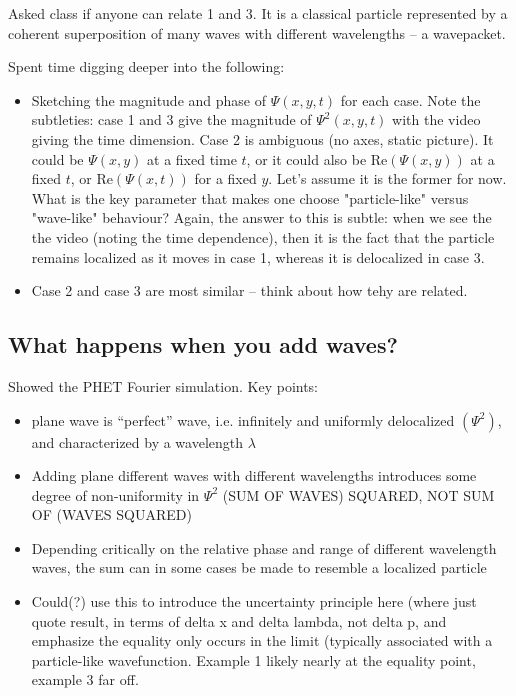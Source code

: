 \documentclass{article}
\begin{document}
Asked class if anyone can relate 1 and 3. It is a classical particle represented by a coherent superposition of many waves with different wavelengths -- a wavepacket. 

Spent time digging deeper into the following:

\begin{itemize}
    \item Sketching the magnitude and phase of $\Psi(x,y,t)$ for each case. Note the subtleties: case 1 and 3 give the magnitude of $\Psi^2(x,y,t)$ with the video giving the time dimension. Case 2 is ambiguous (no axes, static picture). It could be $\Psi(x,y)$ at a fixed time $t$, or it could also be $\text{Re} \left( \Psi(x,y) \right)$ at a fixed $t$, or $\text{Re} \left( \Psi(x,t) \right)$ for a fixed $y$. Let's assume it is the former for now. What is the key parameter that makes one choose "particle-like" versus "wave-like" behaviour? Again, the answer to this is subtle: when we see the the video (noting the time dependence), then it is the fact that the particle remains localized as it moves in case 1, whereas it is delocalized in case 3. 
    \item Case 2 and case 3 are most similar -- think about how tehy are related. 
\end{itemize}

\subsection*{What happens when you add waves?}

Showed the PHET Fourier simulation. Key points:

\begin{itemize}
    \item plane wave is “perfect” wave, i.e. infinitely and uniformly delocalized $(\Psi^2)$, and characterized by a wavelength $\lambda$
    \item Adding plane different waves with different wavelengths introduces some degree of non-uniformity in $\Psi^2$ (SUM OF WAVES) SQUARED, NOT SUM OF (WAVES SQUARED)
    \item Depending critically on the relative phase and range of different wavelength waves, the sum can in some cases be made to resemble a localized particle
    \item Could(?) use this to introduce the uncertainty principle here (where just quote result, in terms of delta x and delta lambda, not delta p, and emphasize the equality only occurs in the limit (typically associated with a particle-like wavefunction.  Example 1 likely nearly at the equality point, example 3 far off.  
\end{itemize}
\end{document}
